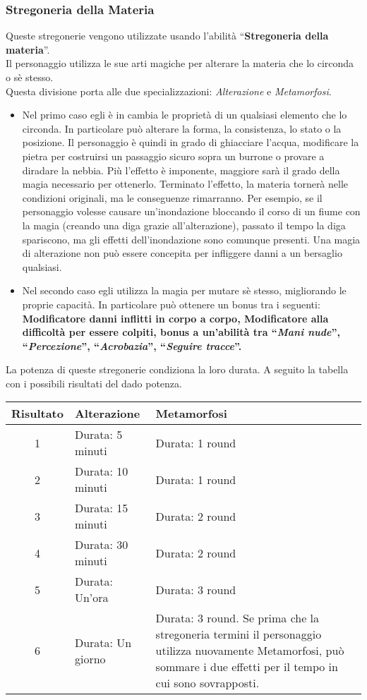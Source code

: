 \documentclass[../manuale_main.tex]{subfiles}
\begin{document}
\subsubsection{Stregoneria della Materia}
Queste stregonerie vengono utilizzate usando l'abilità ``\textbf{Stregoneria della materia}''.\\
Il personaggio utilizza le sue arti magiche per alterare la materia che lo circonda o sè stesso. \\
Questa divisione porta alle due specializzazioni: \emph{Alterazione} e \emph{Metamorfosi}.\\
\begin{itemize}
\item Nel primo caso egli è in cambia le proprietà di un qualsiasi elemento che lo circonda. In particolare può alterare la forma, la consistenza, lo stato o la posizione. Il personaggio è quindi in grado di ghiacciare l'acqua, modificare la pietra per costruirsi un passaggio sicuro sopra un burrone o provare a diradare la nebbia. Più l'effetto è imponente, maggiore sarà il grado della magia necessario per ottenerlo. Terminato l'effetto, la materia tornerà nelle condizioni originali, ma le conseguenze rimarranno. Per esempio, se il personaggio volesse causare un'inondazione bloccando il corso di un fiume con la magia (creando una diga grazie all'alterazione), passato il tempo la diga spariscono, ma gli effetti dell'inondazione sono comunque presenti. Una magia di alterazione non può essere concepita per infliggere danni a un bersaglio qualsiasi.
\item Nel secondo caso egli utilizza la magia per mutare sè stesso, migliorando le proprie capacità. In particolare può ottenere un bonus tra i seguenti: \textbf{Modificatore danni inflitti in corpo a corpo, Modificatore alla difficoltà per essere colpiti, bonus a un'abilità tra ``\emph{Mani nude}'', ``\emph{Percezione}'', ``\emph{Acrobazia}'', ``\emph{Seguire tracce}''.}
\end{itemize}
La potenza di queste stregonerie condiziona la loro durata. A seguito la tabella con i possibili risultati del dado potenza.\\

\begin{tabularx}{\linewidth}{|c |X| X|}
\hline
\textbf{Risultato}&\textbf{Alterazione}&\textbf{Metamorfosi}\\ \hline
1&Durata: 5 minuti&Durata: 1 round\\ \hline
2&Durata: 10 minuti&Durata: 1 round\\ \hline
3&Durata: 15 minuti&Durata: 2 round\\ \hline
4&Durata: 30 minuti&Durata: 2 round\\ \hline
5&Durata: Un'ora&Durata: 3 round\\ \hline
6&Durata: Un giorno&Durata: 3 round. Se prima che la stregoneria termini il personaggio utilizza nuovamente Metamorfosi, può sommare i due effetti per il tempo in cui sono sovrapposti.\\ \hline
\end{tabularx}
\end{document}
